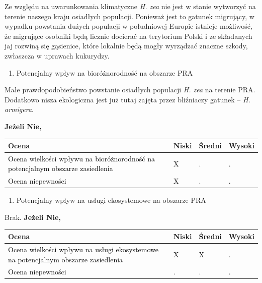 \documentclass[polish,a4paper]{article}
\providecommand{\tightlist}{%
  \setlength{\itemsep}{0pt}\setlength{\parskip}{0pt}}
\begin{document}
Ze względu na uwarunkowania klimatyczne \emph{H. zea} nie jest w stanie
wytworzyć na terenie naszego kraju osiadłych populacji. Ponieważ jest to
gatunek migrujący, w wypadku powstania dużych populacji w południowej
Europie istnieje możliwość, że migrujące osobniki będą licznie docierać
na terytorium Polski i ze składanych jaj rozwiną się gąsienice, które
lokalnie będą mogły wyrządzać znaczne szkody, zwłaszcza w uprawach
kukurydzy.

\begin{enumerate}
\def\labelenumi{\Roman{enumi})}
\tightlist
\item
  Potencjalny wpływ na bioróżnorodność na obszarze PRA
\end{enumerate}

Małe prawdopodobieństwo powstanie osiadłych populacji \emph{H. zea} na
terenie PRA. Dodatkowo nisza ekologiczna jest już tutaj zajęta przez
bliźniaczy gatunek -- \emph{H. armigera}.

\textbf{Jeżeli Nie,}

\begin{tabu} to 
\toprule
{}  \textbf{Ocena} & \textbf{Niski} & \textbf{Średni} & \textbf{Wysoki}\\
\midrule
{}  \textcolor{black}{Ocena wielkości wpływu na bioróżnorodność na potencjalnym obszarze zasiedlenia} & \textcolor{black}{X} & \textcolor{black}{.} & \textcolor{black}{.}\\
  \textcolor{black}{Ocena niepewności} & \textcolor{black}{X} & \textcolor{black}{.} & \textcolor{black}{.}\\
\bottomrule
\end{tabu}

\begin{enumerate}
\def\labelenumi{\Roman{enumi})}
\setcounter{enumi}{1}
\tightlist
\item
  Potencjalny wpływ na usługi ekosystemowe na obszarze PRA
\end{enumerate}

Brak. \textbf{Jeżeli Nie,}

\begin{tabu} to 
\toprule
{}  \textbf{Ocena} & \textbf{Niski} & \textbf{Średni} & \textbf{Wysoki}\\
\midrule
{}  \textcolor{black}{Ocena wielkości wpływu na usługi ekosystemowe na potencjalnym obszarze zasiedlenia} & \textcolor{black}{X} & \textcolor{black}{X} & \textcolor{black}{.}\\
  \textcolor{black}{Ocena niepewności} & \textcolor{black}{.} & \textcolor{black}{.} & \textcolor{black}{.}\\
\bottomrule
\end{tabu}
\end{document}
